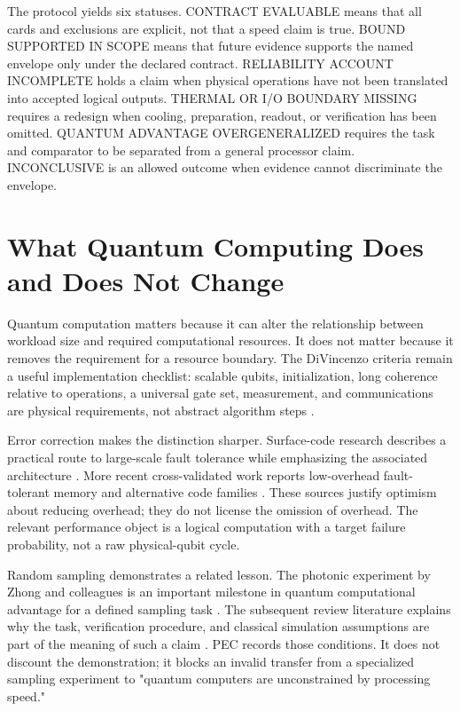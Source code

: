\documentclass[conference]{IEEEtran}
\begin{document}
The protocol yields six statuses. CONTRACT EVALUABLE means that all cards and
exclusions are explicit, not that a speed claim is true. BOUND SUPPORTED IN
SCOPE means that future evidence supports the named envelope only under the
declared contract. RELIABILITY ACCOUNT INCOMPLETE holds a claim when physical
operations have not been translated into accepted logical outputs.
THERMAL OR I/O BOUNDARY MISSING requires a redesign when cooling, preparation,
readout, or verification has been omitted. QUANTUM ADVANTAGE OVERGENERALIZED
requires the task and comparator to be separated from a general processor
claim. INCONCLUSIVE is an allowed outcome when evidence cannot discriminate
the envelope.

\section{What Quantum Computing Does and Does Not Change}

Quantum computation matters because it can alter the relationship between
workload size and required computational resources. It does not matter because
it removes the requirement for a resource boundary. The DiVincenzo criteria
remain a useful implementation checklist: scalable qubits, initialization,
long coherence relative to operations, a universal gate set, measurement, and
communications are physical requirements, not abstract algorithm steps
\cite{divincenzo}.

Error correction makes the distinction sharper. Surface-code research
describes a practical route to large-scale fault tolerance while emphasizing
the associated architecture \cite{fowler}. More recent cross-validated work
reports low-overhead fault-tolerant memory and alternative code families
\cite{bravyi,cohen}. These sources justify optimism about reducing overhead;
they do not license the omission of overhead. The relevant performance object
is a logical computation with a target failure probability, not a raw
physical-qubit cycle.

Random sampling demonstrates a related lesson. The photonic experiment by
Zhong and colleagues is an important milestone in quantum computational
advantage for a defined sampling task \cite{zhong}. The subsequent review
literature explains why the task, verification procedure, and classical
simulation assumptions are part of the meaning of such a claim
\cite{hangleiter}. PEC records those conditions. It does not discount the
demonstration; it blocks an invalid transfer from a specialized sampling
experiment to "quantum computers are unconstrained by processing speed."
\end{document}
